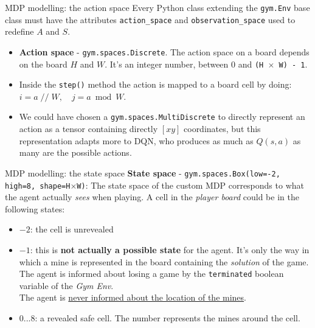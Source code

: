 \begin{frame}{MDP modelling: the action space}
  Every Python class extending the \texttt{gym.Env} base class must have the attributes \texttt{action\_space}
  and \texttt{observation\_space} used to redefine $A$ and $S$.

  \vspace{-0.15cm}
  \begin{itemize}
    \item \textbf{Action space} - \texttt{gym.spaces.Discrete}. The action space on a board depends on the board $H$ and $W$.
          It's an integer number, between 0 and \texttt{(H $\times$ W) - 1}.
    \item  Inside the \texttt{step()} method the action
          is mapped to a board cell by doing: $i = a \operatorname{//} W,\quad j = a \bmod W$.
    \item We could have chosen a \texttt{gym.spaces.MultiDiscrete} to directly represent an action as a tensor containing directly $[x y]$ coordinates,
          but this representation adapts more to DQN, who produces as much as $Q(s,a)$ as many are the possible actions.
  \end{itemize}
\end{frame}

\begin{frame}{MDP modelling: the state space}
  \textbf{State space} - \texttt{gym.spaces.Box(low=-2, high=8, shape=H$\times$W)}: The state space of the custom MDP
  corresponds to what the agent actually \textit{sees} when playing.
  A cell in the \textit{player board} could be in the following states:
  \begin{itemize}
    \item $-2$: the cell is unrevealed
    \item $-1$: this is \textbf{not actually a possible state} for the agent. It's only the way in which
          a mine is represented in the board containing the \textit{solution} of the game.\\
          The agent is informed about losing a game by the \texttt{terminated} boolean variable of the \textit{Gym Env}.\\
          The agent is \underline{never informed about the location of the mines}.
    \item $0...8$: a revealed safe cell. The number represents the mines around the cell.
  \end{itemize}
\end{frame}

